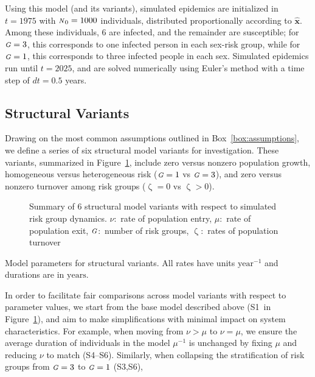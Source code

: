 \documentclass[10pt]{article}
\numberwithin{equation}{section}
\renewcommand{\zeta}{\upzeta}
\newcommand{\N}{{\mbox{\footnotesize{\textit{N}}}}}
\newcommand{\G}{{\mbox{\footnotesize{\textit{G}}}}}
\begin{document}
\par
Using this model (and its variants),
simulated epidemics are initialized in $t = 1975$ with $\N_0 = 1000$ individuals,
distributed proportionally according to $\bm{\hat{x}}$.
Among these individuals, 6 are infected, and the remainder are susceptible;
for $\G = 3$, this corresponds to one infected person in each sex-risk group,
while for $\G = 1$, this corresponds to three infected people in each sex.
Simulated epidemics run until $t = 2025$,
and are solved numerically using Euler's method with a time step of $dt = 0.5$ years.
\subsection{Structural Variants}\label{ss:structure-variants}
Drawing on the most common assumptions outlined in Box~\ref{box:assumptions},
we define a series of six structural model variants for investigation.
These variants, summarized in Figure~\ref{fig:variant-tree}, include
zero versus nonzero population growth,
homogeneous versus heterogeneous risk ($\G = 1$ vs $\G = 3$),
and zero versus nonzero turnover among risk groups ($\zeta = 0$ vs $\zeta > 0$).
\begin{figure}
  \centering
  \caption{Summary of 6 structural model variants with respect to simulated risk group dynamics.
    $\nu$:~rate of population entry,
    $\mu$:~rate of population exit,
    $\G$:~number of risk groups,
    $\zeta$:~rates of population turnover}
  \label{fig:variant-tree}
\end{figure}
\begin{table}
  \centering\caption{Model parameters for structural variants.
    All rates have units $\mathrm{year}^{-1}$ and durations are in $\mathrm{years}$.}
  \label{tab:params-structure}
  
\end{table}
\par
In order to facilitate fair comparisons across model variants with respect to parameter values,
we start from the base model described above (S1~in Figure~\ref{fig:variant-tree}),
and aim to make simplifications with minimal impact on system characteristics.
For example, when moving from $\nu > \mu$ to $\nu = \mu$,
we ensure the average duration of individuals in the model $\mu^{-1}$ is unchanged
by fixing $\mu$ and reducing $\nu$ to match (S4--S6).
Similarly, when collapsing the stratification of risk groups from $\G = 3$ to $\G = 1$ (S3,S6),
\end{document}
